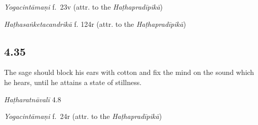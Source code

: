 \begin{ekdosis}
\begin{testimonia}[hp04_034]
\emph{Yogacintāmaṇi} f.~23v (attr. to the \emph{Haṭhapradīpikā})
\begin{versinnote}
\tl{\var{°sāmrājyam icchatā ] U, °sāmrājyadhiṣṭhitaḥ N}\\!}
\end{versinnote}

\emph{Haṭhasaṅketacandrikā} f. 124r (attr. to the \emph{Haṭhapradīpikā})
\begin{versinnote}
\end{versinnote}
\end{testimonia}


\subsection*{4.35}
\begin{translation}[hp04_035]
The sage should block his ears with cotton and fix the mind on the sound which he hears, until he attains a state of stillness.
\end{translation}


\begin{testimonia}[hp04_035]
\emph{Haṭharatnāvalī} 4.8
\begin{versinnote}
\end{versinnote}

\emph{Yogacintāmaṇi} f.~24r (attr. to the \emph{Haṭhapradīpikā})
\begin{versinnote}
\end{versinnote}


\end{testimonia}
\end{ekdosis}
